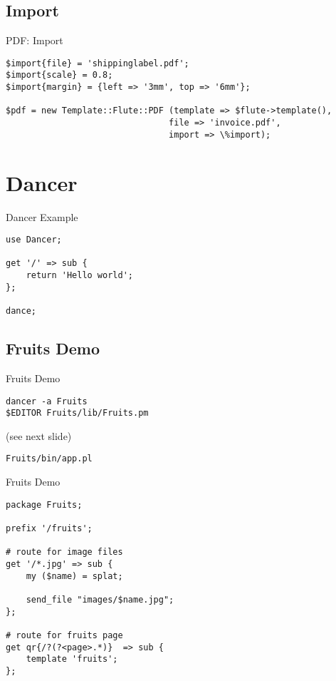 \subsection{Import}
\begin{frame}[fragile]{PDF: Import}
\begin{lstlisting}
$import{file} = 'shippinglabel.pdf';
$import{scale} = 0.8;
$import{margin} = {left => '3mm', top => '6mm'};

$pdf = new Template::Flute::PDF (template => $flute->template(),
                                file => 'invoice.pdf',
                                import => \%import);
\end{lstlisting}
\end{frame}

\section{Dancer}
\begin{frame}[fragile]{Dancer Example}
\begin{lstlisting}
use Dancer;

get '/' => sub {
    return 'Hello world';
};

dance;
\end{lstlisting}
\end{frame}

\subsection{Fruits Demo}
\begin{frame}[fragile]{Fruits Demo}
\begin{lstlisting}
dancer -a Fruits
$EDITOR Fruits/lib/Fruits.pm
\end{lstlisting}

(see next slide)

\begin{lstlisting}
Fruits/bin/app.pl
\end{lstlisting}
\end{frame}

\begin{frame}[fragile]{Fruits Demo}
\begin{lstlisting}
package Fruits;

prefix '/fruits';

# route for image files
get '/*.jpg' => sub {
    my ($name) = splat;

    send_file "images/$name.jpg";
};

# route for fruits page
get qr{/?(?<page>.*)}  => sub {
    template 'fruits';
};
\end{lstlisting}
\end{frame}

